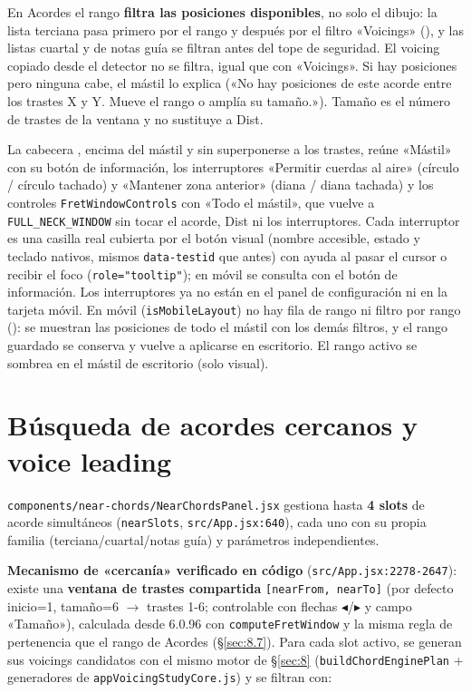 \documentclass[a4paper,11pt,oneside]{report}
\newcommand{\Sref}[1]{\S\ref{#1}}
\begin{document}
En Acordes el rango \textbf{filtra las posiciones disponibles}, no solo el dibujo: la lista terciana pasa primero por el rango y después por el filtro «Voicings» (\texttt{}), y las listas cuartal y de notas guía se filtran antes del tope de seguridad. El voicing copiado desde el detector no se filtra, igual que con «Voicings». Si hay posiciones pero ninguna cabe, el mástil lo explica («No hay posiciones de este acorde entre los trastes X y Y. Mueve el rango o amplía su tamaño.»). Tamaño es el número de trastes de la ventana y no sustituye a Dist.

La cabecera \texttt{}, encima del mástil y sin superponerse a los trastes, reúne «Mástil» con su botón de información, los interruptores «Permitir cuerdas al aire» (círculo / círculo tachado) y «Mantener zona anterior» (diana / diana tachada) y los controles \lstinline!FretWindowControls! con «Todo el mástil», que vuelve a \lstinline!FULL_NECK_WINDOW! sin tocar el acorde, Dist ni los interruptores. Cada interruptor es una casilla real cubierta por el botón visual (nombre accesible, estado y teclado nativos, mismos \lstinline!data-testid! que antes) con ayuda al pasar el cursor o recibir el foco (\lstinline!role="tooltip"!); en móvil se consulta con el botón de información. Los interruptores ya no están en el panel de configuración ni en la tarjeta móvil. En móvil (\lstinline!isMobileLayout!) no hay fila de rango ni filtro por rango (\texttt{}): se muestran las posiciones de todo el mástil con los demás filtros, y el rango guardado se conserva y vuelve a aplicarse en escritorio. El rango activo se sombrea en el mástil de escritorio (solo visual).

\chapter{Búsqueda de acordes cercanos y voice leading}
\label{sec:9}

\lstinline!components/near-chords/NearChordsPanel.jsx! gestiona hasta \textbf{4 slots} de acorde simultáneos (\lstinline!nearSlots!, \lstinline!src/App.jsx:640!), cada uno con su propia familia (terciana/cuartal/notas guía) y parámetros independientes.

\textbf{Mecanismo de «cercanía» verificado en código} (\lstinline!src/App.jsx:2278-2647!): existe una \textbf{ventana de trastes compartida} \lstinline![nearFrom, nearTo]! (por defecto inicio=1, tamaño=6 $\to$ trastes 1-6; controlable con flechas $\blacktriangleleft$/$\blacktriangleright$ y campo «Tamaño»), calculada desde 6.0.96 con \lstinline!computeFretWindow! y la misma regla de pertenencia que el rango de Acordes (\Sref{sec:8.7}). Para cada slot activo, se generan sus voicings candidatos con el mismo motor de \Sref{sec:8} (\lstinline!buildChordEnginePlan! + generadores de \lstinline!appVoicingStudyCore.js!) y se filtran con:
\end{document}
